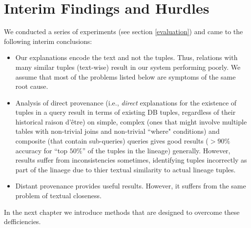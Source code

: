 \section{Interim Findings and Hurdles}
We conducted a series of experiments (see section \ref{evaluation}) and came to the following interim conclusions:
\begin{itemize}
    \item Our explanations encode the text and not the tuples. Thus, relations with many similar tuples (text-wise) result in our system performing poorly. We assume that most of the problems listed below are symptoms of the same root cause.
    \item Analysis of direct provenance (i.e., \textit{direct} explanations for the existence of tuples in a query result in terms of existing DB tuples, regardless of their historical raison d'être) on simple, complex (ones that might involve multiple tables with non-trivial joins and non-trivial ``where" conditions) and composite (that contain sub-queries) queries gives good results ($> 90\%$ accuracy for ``top $50\%$'' of the tuples in the lineage) generally. However, results suffer from inconsistencies sometimes, identifying tuples incorrectly as part of the linaege due to thier textual similarity to actual lineage tuples.
    \item Distant provenance provides useful results. However, it suffers from the same problem of textual closeness.
\end{itemize}

\par In the next chapter we introduce methods that are designed to overcome these defficiencies.

